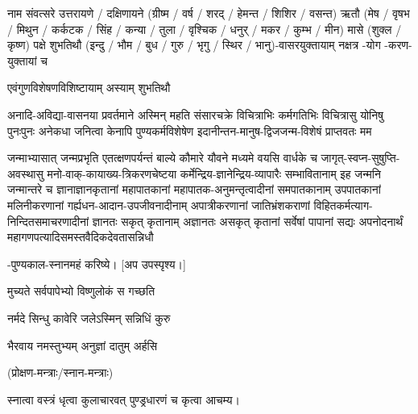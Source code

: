 \blank{} नाम संवत्सरे उत्तरायणे / दक्षिणायने
(ग्रीष्म / वर्ष / शरद् / हेमन्त / शिशिर / वसन्त) ऋतौ (मेष / वृषभ / मिथुन / कर्कटक / सिंह / कन्या / तुला /
वृश्चिक / धनुर् / मकर / कुम्भ / मीन) मासे (शुक्ल / कृष्ण) पक्षे \blank{} शुभतिथौ
(इन्दु / भौम / बुध / गुरु / भृगु / स्थिर / भानु)-वासरयुक्तायाम्
\blank{} नक्षत्र \blank{}-योग \blank-करण-युक्तायां च

एवं\-गुण\-विशेषण\-विशिष्टायाम् अस्याम् \blank{} शुभतिथौ

अनादि-अविद्या-वासनया प्रवर्तमाने अस्मिन् महति संसारचक्रे विचित्राभिः कर्मगतिभिः विचित्रासु योनिषु
पुनःपुनः अनेकधा जनित्वा केनापि पुण्यकर्मविशेषेण इदानीन्तन-मानुष-द्विजजन्म-विशेषं प्राप्तवतः मम

जन्माभ्यासात् जन्मप्रभृति एतत्क्षणपर्यन्तं बाल्ये कौमारे यौवने मध्यमे वयसि वार्धके च
जागृत्-स्वप्न-सुषुप्ति-अवस्थासु मनो-वाक्-कायाख्य-त्रिकरणचेष्टया कर्मेन्द्रिय-ज्ञानेन्द्रिय-व्यापारैः
सम्भावितानाम् इह जन्मनि जन्मान्तरे च ज्ञानाज्ञानकृतानां महापातकानां महापातक-अनुमन्तृत्वादीनां
समपातकानाम् उपपातकानां मलिनी\-करणानां गर्ह्यधन-आदान-उपजीवनादीनाम् अपात्रीकरणानां जातिभ्रंश\-कराणां
विहित\-कर्म\-त्याग-निन्दित\-समाचरणादीनां ज्ञानतः सकृत् कृतानाम् अज्ञानतः असकृत् कृतानां सर्वेषां पापानां
सद्यः अपनोदनार्थं महागणपत्यादिसमस्तवैदिकदेवतासन्निधौ

\blank-पुण्यकाल-स्नानमहं करिष्ये। [अप उपस्पृश्य।]

{मुच्यते सर्वपापेभ्यो विष्णुलोकं स गच्छति}

{नर्मदे सिन्धु कावेरि जलेऽस्मिन् सन्निधिं कुरु}

{भैरवाय नमस्तुभ्यम् अनुज्ञां दातुम् अर्हसि}

\centerline{(प्रोक्षण-मन्त्राः/स्नान-मन्त्राः)}

स्नात्वा वस्त्रं धृत्वा कुलाचारवत् पुण्ड्रधारणं च कृत्वा आचम्य।

\closesection